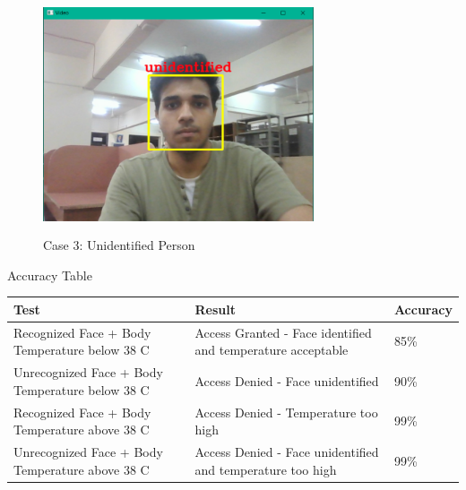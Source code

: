 \documentclass[conference]{IEEEtran}
\begin{document}
	\begin{figure}
		\centering
		\includegraphics[width=8cm, height=7cm]{Un.png}
		\caption{\label{fig:The-caption}Case 3: Unidentified Person}
	\end{figure}
	\begin{center}
		\caption{Accuracy Table}
		\begin{tabular}{ | m{6em} | m{3cm}| m{2cm} | } 
			\hline
			Test& Result & Accuracy \\ 
			\hline
			Recognized Face
			+ Body
			Temperature
			below 38 C & Access Granted -
			Face identified
			and temperature
			acceptable & 85\% \\ 
			\hline
			Unrecognized
			Face + Body
			Temperature
			below 38 C & Access Denied -
			Face unidentified & 90\% \\ 
			\hline
			Recognized Face
			+ Body
			Temperature
			above 38 C & Access Denied -
			Temperature too
			high & 99\% \\
			\hline
			Unrecognized
			Face + Body
			Temperature
			above 38 C & Access Denied -
			Face unidentified
			and temperature
			too high & 99\% \\
			\hline
		\end{tabular}
		\label{tab:caption}
	\end{center}

	\hfill
\end{document}
